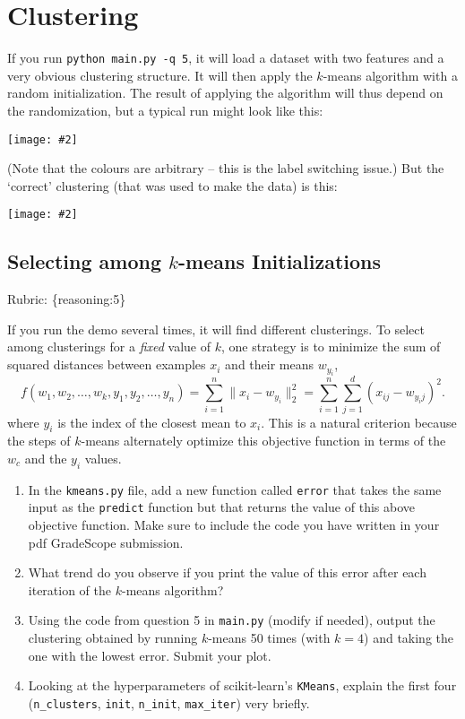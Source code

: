 \documentclass{article}
\def\rubric#1{\gre{Rubric: \{#1\}}}{}
\def\blu#1{{\color{blu}#1}}
\def\gre#1{{\color{gre}#1}}
\def\norm#1{\|#1\|}
\newcommand{\centerfig}[2]{\begin{center}\texttt{[image: \#2]}\end{center}}
\def\enum#1{\begin{enumerate}#1\end{enumerate}}
\begin{document}
\section{Clustering}

If you run \verb|python main.py -q 5|, it will load a dataset with two features
and a very obvious clustering structure. It will then apply the $k$-means algorithm
with a random initialization. The result of applying the
algorithm will thus depend on the randomization, but a typical run might look like this:
\centerfig{.5}{../figs/kmeans_basic.png}
(Note that the colours are arbitrary -- this is the label switching issue.)
But the `correct' clustering (that was used to make the data) is this:
\centerfig{.5}{../figs/kmeans_good.png}


\subsection{Selecting among $k$-means Initializations}
\rubric{reasoning:5}

If you run the demo several times, it will find different clusterings. To select among clusterings for a \emph{fixed} value of $k$, one strategy is to minimize the sum of squared distances between examples $x_i$ and their means $w_{y_i}$,
\[
f(w_1,w_2,\dots,w_k,y_1,y_2,\dots,y_n) = \sum_{i=1}^n \norm{x_i - w_{y_i}}_2^2 = \sum_{i=1}^n \sum_{j=1}^d (x_{ij} - w_{y_ij})^2.
\]
 where $y_i$ is the index of the closest mean to $x_i$. This is a natural criterion because the steps of $k$-means alternately optimize this objective function in terms of the $w_c$ and the $y_i$ values.

 \blu{\enum{
 \item In the \texttt{kmeans.py} file, add a new function called \texttt{error} that takes the same input as the \texttt{predict} function but that returns the value of this above objective function.  Make sure to include the code you have written in your pdf GradeScope submission.
 \item What trend do you observe if you print the value of this error after each iteration of the $k$-means algorithm?
 \item Using the code from question 5 in \texttt{main.py} (modify if needed), output the clustering obtained by running $k$-means 50 times (with $k=4$) and taking the one with the lowest error. Submit your plot.
 \item Looking at the hyperparameters of scikit-learn's \texttt{KMeans}, explain the first four (\texttt{n\_clusters}, \texttt{init}, \texttt{n\_init}, \texttt{max\_iter}) very briefly.
 }}
\end{document}
